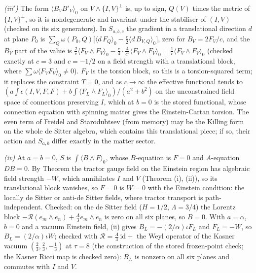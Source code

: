 \emph{(iii$'$)} The form $\langle B_{V}B'_{V}\rangle_{0}$ on $V \wedge \{I, V\}^{\perp}$ is, up to sign, $Q(V)$ times the metric of $\{I, V\}^{\perp}$, so it is nondegenerate and invariant under the stabiliser of $(I, V)$ (checked on its six generators). In $S_{a,b,c}$ the gradient in a translational direction $d$ at plane $P_{0}$ is $\sum_{Q}\omega(P_{0}, Q)\big[\langle d\,F_{Q}\rangle_{0} - \tfrac{c}{2}\langle d\,B_{V,Q}\rangle_{0}\big]$, zero for $B_{V} = 2F_{V}/c$, and the $B_{V}$ part of the value is $\tfrac{2}{c}\langle F_{V}\wedge F_{V}\rangle_{0} - \tfrac{c}{4}\cdot\tfrac{4}{c^{2}}\langle F_{V}\wedge F_{V}\rangle_{0} = \tfrac1c\langle F_{V}\wedge F_{V}\rangle_{0}$ (checked exactly at $c = 3$ and $c = -1/2$ on a field strength with a translational block, where $\sum\omega\langle F_{V}F_{V}\rangle_{0} \neq 0$). $F_{V}$ is the torsion block, so this is a torsion-squared term; it replaces the constraint $T = 0$, and as $c \to \infty$ the effective functional tends to $(a\int\epsilon(I, V, F, F) + b\int\langle F_{L}\wedge F_{L}\rangle_{0})/(a^{2}+b^{2})$ on the unconstrained field space of connections preserving $I$, which at $b = 0$ is the stored functional, whose connection equation with spinning matter gives the Einstein-Cartan torsion. The even term of Freidel and Starodubtsev (from memory) may be the Killing form on the whole de Sitter algebra, which contains this translational piece; if so, their action and $S_{a,b}$ differ exactly in the matter sector.

\emph{(iv)} At $a = b = 0$, $S$ is $\int\langle B \wedge F\rangle_{0}$, whose $B$-equation is $F = 0$ and $A$-equation $DB = 0$. By Theorem  the tractor gauge field on the Einstein region has algebraic field strength $-W$, which annihilates $I$ and $V$ (Theorem (i), (ii)), so its translational block vanishes, so $F = 0$ is $W = 0$ with the Einstein condition: the locally de Sitter or anti-de Sitter fields, where tractor transport is path-independent. Checked: on the de Sitter field ($H = 1/2$, $\Lambda = 3/4$) the Lorentz block $-\mathcal{R}(e_{m}\wedge e_{n}) + \tfrac{\Lambda}{3}e_{m}\wedge e_{n}$ is zero on all six planes, so $B = 0$. With $a = \alpha$, $b = 0$ and a vacuum Einstein field, (ii) gives $B_{L} = -(2/\alpha)\iota F_{L}$ and $F_{L} = -W$, so $B_{L} = (2/\alpha)\iota W$; checked with $\mathcal{R} = \tfrac{\Lambda}{3}\,\mathrm{id} + $ the Weyl operator of the Kasner vacuum $(\tfrac23, \tfrac23, -\tfrac13)$ at $\tau = 8$ (the construction of the stored frozen-point check; the Kasner Ricci map is checked zero): $B_{L}$ is nonzero on all six planes and commutes with $I$ and $V$.

